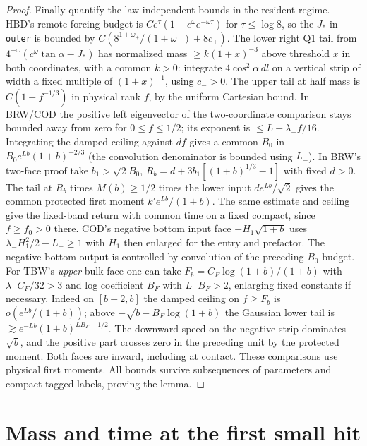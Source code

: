 \documentclass[11pt]{article}
\begin{document}
\begin{proof}
Finally quantify the law-independent bounds in the resident regime. HBD's remote forcing budget is $C e^\tau(1+c^\omega e^{-\omega\tau})$ for $\tau\le\log8$, so the $J_*$ in \texttt{outer} is bounded by $C(8^{1+\omega_+}/(1+\omega_-)+8c_+)$. The lower right Q1 tail from $4^{-\omega}(c^\omega\tan\alpha-J_*)$ has normalized mass $\ge k(1+x)^{-3}$ above threshold $x$ in both coordinates, with a common $k>0$: integrate $4\cos^2\alpha\,dl$ on a vertical strip of width a fixed multiple of $(1+x)^{-1}$, using $c_->0$. The upper tail at half mass is $C(1+f^{-1/3})$ in physical rank $f$, by the uniform Cartesian bound. In BRW/COD the positive left eigenvector of the two-coordinate comparison stays bounded away from zero for $0\le f\le1/2$; its exponent is $\le L-\lambda_- f/16$. Integrating the damped ceiling against $df$ gives a common $B_0$ in $B_0e^{Lb}(1+b)^{-2/3}$ (the convolution denominator is bounded using $L_-$). In BRW's two-face proof take $b_1>\sqrt2 B_0$, $R_b=d+3b_1[(1+b)^{1/3}-1]$ with fixed $d>0$. The tail at $R_b$ times $M(b)\ge1/2$ times the lower input $d e^{Lb}/\sqrt2$ gives the common protected first moment $k'e^{Lb}/(1+b)$. The same estimate and ceiling give the fixed-band return with common time on a fixed compact, since $f\ge f_0>0$ there. COD's negative bottom input face $-H_1\sqrt{1+b}$ uses $\lambda_-H_1^2/2-L_+\ge1$ with $H_1$ then enlarged for the entry and prefactor. The negative bottom output is controlled by convolution of the preceding $B_0$ budget. For TBW's \emph{upper} bulk face one can take $F_b=C_F\log(1+b)/(1+b)$ with $\lambda_- C_F/32>3$ and log coefficient $B_F$ with $L_-B_F>2$, enlarging fixed constants if necessary. Indeed on $[b-2,b]$ the damped ceiling on $f\ge F_b$ is $o(e^{Lb}/(1+b))$; above $-\sqrt{b-B_F\log(1+b)}$ the Gaussian lower tail is $\gtrsim e^{-Lb}(1+b)^{LB_F-1/2}$. The downward speed on the negative strip dominates $\sqrt b$, and the positive part crosses zero in the preceding unit by the protected moment. Both faces are inward, including at contact. These comparisons use physical first moments. All bounds survive subsequences of parameters and compact tagged labels, proving the lemma.
\end{proof}

\section{Mass and time at the first small hit}\label{an04e5rv1:mass}
\end{document}
